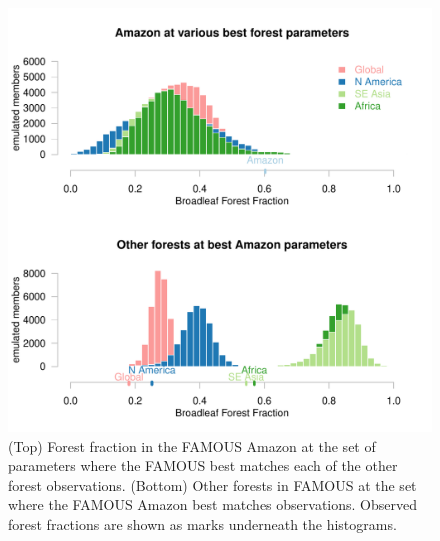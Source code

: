 \documentclass[esd, manuscript]{copernicus}
\begin{document}
\begin{figure}[t]
\includegraphics[width=12cm]{graphics/best_inputs_swaps_hists_Paired.pdf}
\caption{(Top) Forest fraction in the FAMOUS Amazon at the set of parameters where the FAMOUS best matches each of the other forest observations. (Bottom) Other forests in FAMOUS at the set where the FAMOUS Amazon best matches observations. Observed forest fractions are shown as marks underneath the histograms.}
\label{fig:best_inputs_swaps_hists_Paired}
\end{figure}
\end{document}
